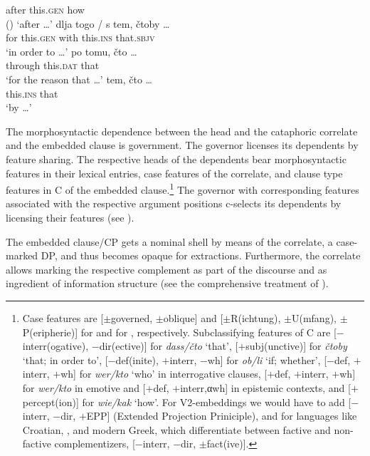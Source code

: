\documentclass[output=paper]{langscibook}
\begin{document}
    after this.\textsc{gen} how {} \\ \hfill ()
    \glt `after {\dots}'
    \ex \gll dlja togo / s tem, čtoby {\dots} \\
    for this.\textsc{gen} {} with this.\textsc{ins} that.\textsc{sbjv} \\
    \glt `in order to {\dots}'
    \ex \gll po tomu, čto {\dots} \\
    through this.\textsc{dat} that {} \\
    \glt `for the reason that {\dots}'
    \ex \gll tem, čto {\dots} \\
    this.\textsc{ins} that {} \\
    \glt `by {\dots}'
\z\z\largerpage


\noindent The morphosyntactic dependence between the head and the cataphoric correlate and the embedded clause is government. The governor licenses its dependents by feature sharing. The respective heads of the dependents bear morphosyntactic features in their lexical entries, case features of the correlate, and clause type features in C of the embedded clause.\footnote{\label{fn:casefeatures}Case features are [$\pm$governed, $\pm$oblique] and [$\pm$R(ichtung), $\pm$U(mfang), $\pm$P(eripherie)] for  \citep[see][]{Bierwisch1967} and for  \citep[see][]{Jakobson1936,Jakobson1958}, respectively. Subclassifying features of C are [$-$interr(ogative), $-$dir(ective)] for \textit{dass/čto} `that', [$+$subj(unctive)] for \textit{čtoby} `that; in order to', [$-$def(inite), $+$interr, $-$wh] for \textit{ob/li} `if; whether', [$-$def, $+$interr, $+$wh] for \textit{wer/kto} `who' in interrogative clauses, [$+$def, $+$interr, $+$wh] for \textit{wer/kto} in emotive and [$+$def, $+$interr,αwh] in epistemic contexts, and [$+$percept(ion)] for \textit{wie/kak} `how'. For  V2-embeddings we would have to add [$-$interr, $-$dir, $+$EPP] (Extended Projection Priniciple), and for languages like Croatian, , and modern Greek, which differentiate between factive and non-factive complementizers, [$-$interr, $-$dir, $\pm$fact(ive)].}
The governor with corresponding features associated with the respective argument positions c-selects its dependents by licensing their features (see \citealt{Zimmermann1990,Zimmermann2013,Pitsch2014a,Pitsch2014b}).

The embedded clause/CP gets a nominal shell by means of the correlate, a case-marked DP, and thus becomes opaque for extractions. Furthermore, the correlate allows marking the respective complement as part of the discourse and as ingredient of information structure (see the comprehensive treatment of \citealt{Willer-Gold2013}).
\end{document}
